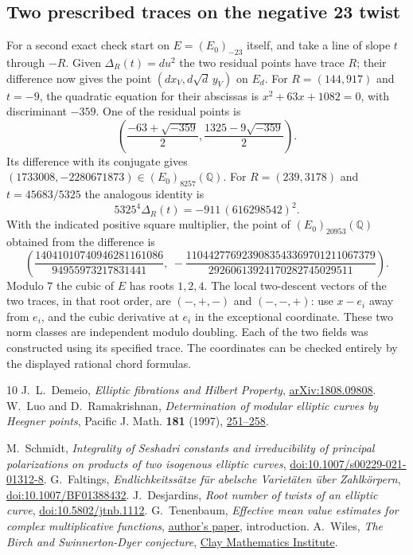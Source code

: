 \documentclass[11pt]{article}
\begin{document}
\subsection{Two prescribed traces on the negative 23 twist}
For a second exact check start on $E=(E_0)_{-23}$ itself, and take
a line of slope $t$ through $-R$. Given $\Delta_R(t)=du^2$ the two
residual points have trace $R$; their difference now gives the point
$(d x_V,d\sqrt d\,y_V)$ on $E_d$.
For $R=(144,917)$ and $t=-9$, the quadratic equation for their
abscissas is $x^2+63x+1082=0$, with discriminant $-359$.
One of the residual points is
\[
 \left(\frac{-63+\sqrt{-359}}{2},
       \frac{1325-9\sqrt{-359}}{2}\right).
\]
Its difference with its conjugate gives
$(1733008,-2280671873)\in(E_0)_{8257}(\mathbb Q)$.
For $R=(239,3178)$ and $t=45683/5325$ the analogous identity is
\[
 5325^4\Delta_R(t)=-911\,(616298542)^2 .
\]
With the indicated positive square multiplier, the point of
$(E_0)_{20953}(\mathbb Q)$ obtained from the difference is
\[
 \left(\frac{14041010740946281161086}{94955973217831441},\
       -\frac{1104427769239083543369701211067379}
                   {29260613924170282745029511}\right).
\]
Modulo $7$ the cubic of $E$ has roots $1,2,4$. The local two-descent
vectors of the two traces, in that root order, are $(-,+,-)$ and
$(-,-,+)$: use $x-e_i$ away from $e_i$, and the cubic derivative
at $e_i$ in the exceptional coordinate. These two norm classes are
independent modulo doubling. Each of the two fields was constructed
using its specified trace. The coordinates can be checked entirely
by the displayed rational chord formulas.

\begingroup\raggedright
\begin{thebibliography}{10}
 J.~L.~Demeio, \emph{Elliptic fibrations and Hilbert Property}, \href{https://arxiv.org/abs/1808.09808}{arXiv:1808.09808}.
\bibitem{LR} W.~Luo and D.~Ramakrishnan, \emph{Determination of modular elliptic curves by Heegner points}, Pacific J. Math. \textbf{181} (1997), \href{https://msp.org/pjm/1997/181-3/pjm-v181-n3-p13-s.pdf}{251--258}.

 M.~Schmidt, \emph{Integrality of Seshadri constants and irreducibility of principal polarizations on products of two isogenous elliptic curves}, \href{https://doi.org/10.1007/s00229-021-01312-8}{doi:10.1007/s00229-021-01312-8}.
\bibitem{faltings} G.~Faltings, \emph{Endlichkeitss\"atze f\"ur abelsche Variet\"aten \"uber Zahlk\"orpern}, \href{https://doi.org/10.1007/BF01388432}{doi:10.1007/BF01388432}.
\bibitem{root} J.~Desjardins, \emph{Root number of twists of an elliptic curve}, \href{https://doi.org/10.5802/jtnb.1112}{doi:10.5802/jtnb.1112}.
\bibitem{ten} G.~Tenenbaum, \emph{Effective mean value estimates for complex multiplicative functions}, \href{https://tenenb.perso.math.cnrs.fr/PPP/Eff-mean-values.pdf}{author's paper}, introduction.
\bibitem{wiles} A.~Wiles, \emph{The Birch and Swinnerton-Dyer conjecture}, \href{https://www.claymath.org/wp-content/uploads/2022/05/birchswin.pdf}{Clay Mathematics Institute}.
\end{thebibliography}\endgroup
\end{document}
